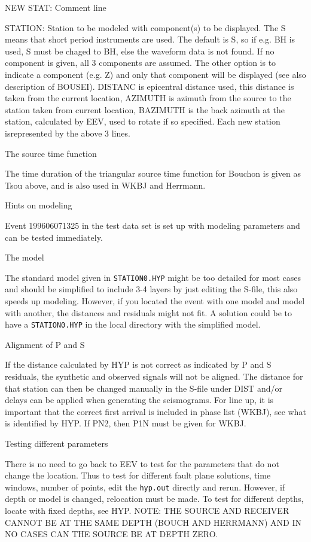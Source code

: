 NEW STAT: Comment line 

STATION: Station to be modeled with component(s) to be displayed. The S means that short period 
instruments are used. 
The default is S, so if e.g. BH is used, S must be chaged to BH, else 
the waveform data is not found. If no component is given, all 3 
components are assumed. The other option is to indicate a component (e.g. Z) and only that component will be displayed (see also description of BOUSEI). DISTANC is epicentral distance used, this distance is taken from the current location, AZIMUTH is azimuth from the source to the station taken from current location, BAZIMUTH is the back azimuth at the station, calculated by EEV, used to rotate if so specified. Each new station isrepresented by the above 3 lines. 

The source time function 

The time duration of the triangular source time function for Bouchon is given as Tsou above, and is 
also used in WKBJ and Herrmann. 

Hints on modeling 

Event 199606071325 in the test data set is set up with modeling parameters and can be tested 
immediately. 

The model 

The standard model given in \texttt{STATION0.HYP} might be too detailed for most cases and should be simplified to include 3-4 layers by just editing the S-file, this also speeds up modeling. However, if you located the event with one model and model with another, the distances and residuals might not fit. A solution could be to have a \texttt{STATION0.HYP} in the local directory with the simplified model. 

Alignment of P and S 

If the distance calculated by HYP is not correct as indicated by P and S residuals, the synthetic and observed signals will not be aligned. The distance for that station can then be changed manually in the S-file under DIST and/or delays can be applied when generating the seismograms. 
For line up, it is important that the correct first arrival is included 
in phase list (WKBJ), see what is identified by HYP. If PN2, then P1N must be given for WKBJ.

Testing different parameters 

There is no need to go back to EEV to test for the parameters that do not change the location. Thus to test for different fault plane solutions, time windows, number of points, edit the \texttt{hyp.out} directly and rerun. However, if depth or model is changed, relocation must be made. To test for different depths, locate with fixed depths, see HYP. \newline
NOTE: THE SOURCE AND RECEIVER CANNOT BE AT THE SAME DEPTH (BOUCH AND HERRMANN) AND IN NO CASES CAN THE SOURCE BE AT DEPTH ZERO. 


